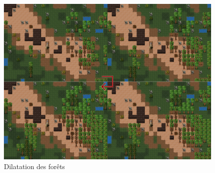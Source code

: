 \documentclass[a4paper]{article}
\begin{document}
          \begin{figure}
            \begin{center}
              \includegraphics[scale=0.2]{img/DilateForest.png}
            \end{center}
            \caption{Dilatation des forêts}
          \end{figure}
        
\end{document}
